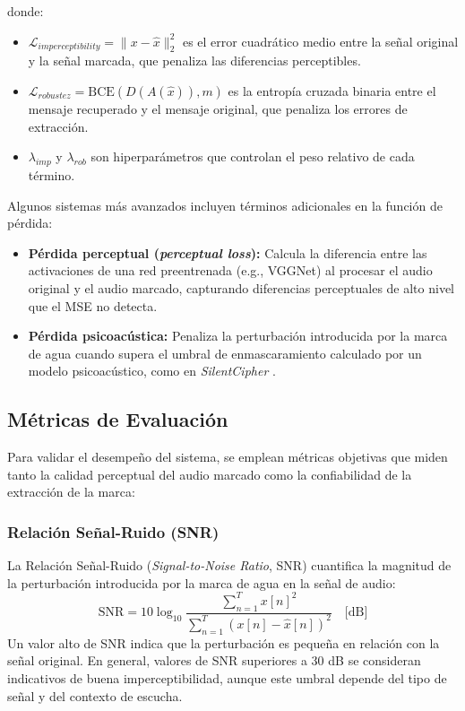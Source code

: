 donde:
\begin{itemize}
    \item $\mathcal{L}_{imperceptibility} = \|x - \hat{x}\|_2^2$ es el error cuadrático medio entre la señal original y la señal marcada, que penaliza las diferencias perceptibles.
    \item $\mathcal{L}_{robustez} = \text{BCE}(D(A(\hat{x})), m)$ es la entropía cruzada binaria entre el mensaje recuperado y el mensaje original, que penaliza los errores de extracción.
    \item $\lambda_{imp}$ y $\lambda_{rob}$ son hiperparámetros que controlan el peso relativo de cada término.
\end{itemize}

Algunos sistemas más avanzados incluyen términos adicionales en la función de pérdida:
\begin{itemize}
    \item \textbf{Pérdida perceptual (\textit{perceptual loss}):} Calcula la diferencia entre las activaciones de una red preentrenada (e.g., VGGNet) al procesar el audio original y el audio marcado, capturando diferencias perceptuales de alto nivel que el MSE no detecta.
    \item \textbf{Pérdida psicoacústica:} Penaliza la perturbación introducida por la marca de agua cuando supera el umbral de enmascaramiento calculado por un modelo psicoacústico, como en \textit{SilentCipher} \cite{singh2024silentcipher}.
\end{itemize}

\subsection{Métricas de Evaluación}
\label{sec:metricas}

Para validar el desempeño del sistema, se emplean métricas objetivas que miden tanto la calidad perceptual del audio marcado como la confiabilidad de la extracción de la marca:

\subsubsection{Relación Señal-Ruido (SNR)}

La Relación Señal-Ruido (\textit{Signal-to-Noise Ratio}, SNR) cuantifica la magnitud de la perturbación introducida por la marca de agua en la señal de audio:
\begin{equation}
    \text{SNR} = 10 \log_{10} \frac{\sum_{n=1}^{T} x[n]^2}{\sum_{n=1}^{T} (x[n] - \hat{x}[n])^2} \quad \text{[dB]}
\end{equation}
Un valor alto de SNR indica que la perturbación es pequeña en relación con la señal original. En general, valores de SNR superiores a 30 dB se consideran indicativos de buena imperceptibilidad, aunque este umbral depende del tipo de señal y del contexto de escucha.

